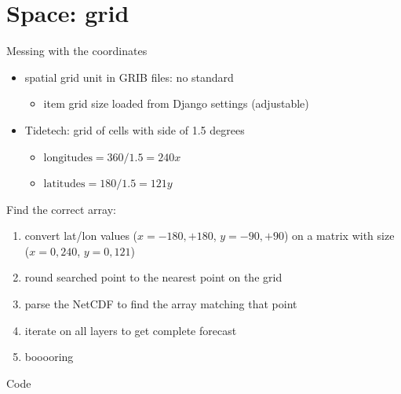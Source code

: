 \documentclass[xcolor=svgnames]{beamer}
\begin{document}

\section{Space: grid}

    \begin{frame}{Messing with the coordinates}
        \begin{itemize}
            \item spatial grid unit in GRIB files: no standard
                \begin{itemize}
                    \item item grid size loaded from Django settings (adjustable)
                \end{itemize}
            \item Tidetech: grid of cells with side of 1.5 degrees
                \begin{itemize}
                    \item $\text{longitudes} = 360/1.5 = 240 x$
                    \item $\text{latitudes} = 180/1.5 = 121 y$
                \end{itemize}
        \end{itemize}
        \pause
        Find the correct array:
        \begin{enumerate}
            \item convert lat/lon values ($x={-180,+180}$, $y={-90,+90}$) on a matrix with size ($x={0,240}$, $y={0,121}$)
            \pause
            \item round searched point to the nearest point on the grid
            \pause
            \item parse the NetCDF to find the array matching that point
            \pause
            \item iterate on all layers to get complete forecast
            \pause
            \item booooring
        \end{enumerate}
    \end{frame}

    \begin{frame}{Code}
        \note{\scriptsize{}}
        \note{\scriptsize{}}
    \end{frame}
\end{document}
